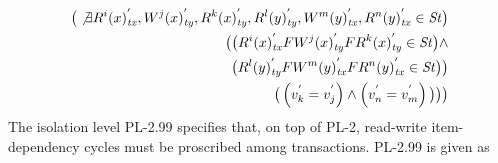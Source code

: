 \documentclass{sig-alternate-05-2015}
\begin{document}
\begin{align}
\begin{split}
    \big( \not\exists {R^i}(x)^{'}_\mathit{tx}, {W^j}(x)^{'}_\mathit{ty}, {R^k}(x)^{'}_\mathit{ty}, {R^l}(y)^{'}_\mathit{ty}, {W^m}(y)^{'}_\mathit{tx}, {R^n}(y)^{'}_\mathit{tx} \in \mathit{St} \big)  \\
     \big( \big( {R^i}(x)^{'}_\mathit{tx} F {W^j}(x)^{'}_\mathit{ty} F {R^k}(x)^{'}_\mathit{ty} \in \mathit{St} \big) \wedge \\
  \big(  {R^l}(y)^{'}_\mathit{ty} F {W^m}(y)^{'}_\mathit{tx} F {R^n}(y)^{'}_\mathit{tx} \in \mathit{St} \big)  \big)  \\
  \big(  \left( v_k^{'} = v_j^{'} \right) \wedge
 \left( v_n^{'} = v_m^{'} \right) \big) \big) \big)
\end{split}
  \end{align}
  The isolation level  PL-2.99 specifies that, on top of PL-2, read-write item-dependency cycles must be proscribed among transactions. PL-2.99 is given as
\end{document}
